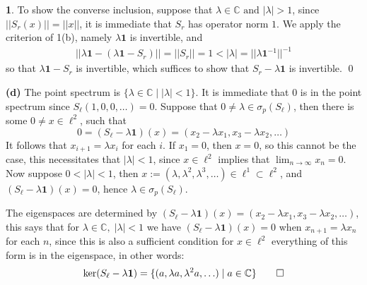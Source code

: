 \documentclass[11pt]{article}
\theoremstyle{definition}
\newtheorem{pb}{}
\newcommand{\set}[1]{\{#1\}}
\newcommand{\abs}[1]{\left\vert#1\right\vert}
\newcommand{\norm}[1]{\lvert\lvert#1\rvert\rvert}
\newcommand{\tand}{\text{ and }}
\begin{document}
\begin{pb}
        To show the converse inclusion, suppose that \(\lambda \in \mathbb{C} \tand \abs{\lambda} > 1\), since \(\norm{S_r(x)} = \norm{x}\), it is immediate that \(S_r\) has operator norm \(1\). We apply the criterion of 1(b), namely \(\lambda\mathbf{1}\) is invertible, and
        \begin{align*}
            \norm{\lambda\mathbf{1} - (\lambda\mathbf{1} - S_r)} = \norm{S_r} = 1 < \abs{\lambda} = \norm{\lambda\mathbf{1}^{-1}}^{-1}
        \end{align*}
        so that \(\lambda\mathbf{1} - S_r\) is invertible, which suffices to show that \(S_r - \lambda\mathbf{1}\) is invertible. \qed

        \textbf{(d)} The point spectrum is \(\set{\lambda \in \mathbb{C} \mid \abs{\lambda} < 1}\). It is immediate that \(0\) is in the point spectrum since \(S_\ell(1,0,0,\hdots) = 0\). Suppose that \(0 \neq \lambda \in \sigma_p(S_\ell)\), then there is some \(0 \neq x \in \ell^2\), such that 
        \[0 = (S_\ell - \lambda\mathbf{1})(x) = (x_2 - \lambda x_1, x_3 - \lambda x_2, \hdots)\]
        It follows that \(x_{i+1} = \lambda x_i\) for each \(i\). If \(x_1 = 0\), then \(x = 0\), so this cannot be the case, this necessitates that \(\abs{\lambda} < 1\), since \(x \in \ell^2\) implies that \(\lim_{n\to\infty}x_n = 0\). Now suppose \(0 < \abs{\lambda} < 1\), then \(x := (\lambda,\lambda^2,\lambda^3, \hdots) \in \ell^1 \subset \ell^2\), and \((S_\ell - \lambda\mathbf{1})(x) = 0\), hence \(\lambda \in \sigma_p(S_\ell)\).

        The eigenspaces are determined by \((S_\ell - \lambda\mathbf{1})(x) = (x_2 - \lambda x_1, x_3 - \lambda x_2, \hdots)\), this says that for \(\lambda \in \mathbb{C}, \; \abs{\lambda} < 1\) we have \((S_{\ell} - \lambda\mathbf{1})(x) = 0\) when \(x_{n+1} = \lambda x_n\) for each \(n\), since this is also a sufficient condition for \(x \in\ell^2\) everything of this form is in the eigenspace, in other words:
        \begin{align*}
            \ker(S_{\ell} - \lambda\mathbf{1}) = \set{(a,\lambda a, \lambda^2 a,\hdots) \mid a \in \mathbb{C}} \qed
        \end{align*}


\end{pb}
\end{document}
